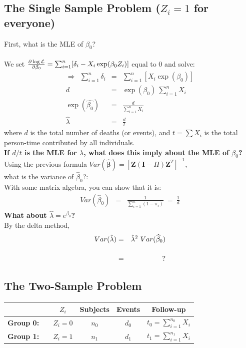 \documentclass[11pt,psfig]{book}
\newcommand{\bfZ}{\mathbf{Z}}
\newcommand{\bfbeta}{\mathbf{\beta}}
\newcommand{\bfI}{\mathbf{I}}
\begin{document}
\subsection{The Single Sample Problem ($ Z_i = 1$ for everyone)}

First, what is the MLE of $\beta_0$?\\
\\[2ex]
We set  $\frac{\partial\log{\cal L}}{\partial
\beta_0}=\sum_{i=1}^{n}  [{\delta_i} - X_i \exp( \beta_0 Z_i )]$
equal to 0 and solve:
\begin{eqnarray*}
\Rightarrow ~~ \sum_{i=1}^{n} {\delta_i} & = &
\sum_{i=1}^{n} [X_i \exp(\beta_0)]\\
d & = & \exp(\beta_0) ~\sum_{i=1}^n X_i\\
\exp(\widehat{\beta_0}) & = & \frac{d}{\sum_{i=1}^n X_i}\\
\hat{\lambda} & = & \frac{d}{t}
\end{eqnarray*}
where $d$ is the total number of deaths (or events), and
$t=\sum X_i$ is the total person-time contributed by all individuals.
\\[2ex]
{\bf If $d/t$ is the MLE for $\lambda$, what does this imply about
the MLE of $\beta_0$?}
\\[2ex]
Using the previous formula
$Var(\hat{\bfbeta}) = \left[ \bfZ (\bfI-\Pi) \bfZ^T \right]^{-1}$, \\
what is the variance of $\widehat{\beta}_0$?:
\\[2ex]
With some matrix algebra, you can show that it is:
\begin{eqnarray*}
Var(\widehat{\beta}_0) & = & \frac{1}{\sum_{i=1}^n (1-\pi_i)} ~=~ \frac{1}{d}
\end{eqnarray*}
{\bf What about $\hat{\lambda} = e^{\hat{\beta}_0}$?}
\\[2ex]
By the delta method,
\begin{eqnarray*}
Var(\hat{\lambda}) & = & \hat\lambda^2 ~ Var(\widehat{\beta}_0)\\[3ex]
& = & ~~{\bf ?}
\end{eqnarray*}
\subsection{The Two-Sample Problem}
\begin{center}
\begin{tabular}{lcccc}
\hline
& $Z_i$ & Subjects & Events & Follow-up \\ \hline
{\bf Group 0:}~~
& $Z_{i}= 0$ & $n_0$ & $d_0$ & $t_0=\sum_{i=1}^{n_0} X_i$\\[1ex]
{\bf Group 1:}
& $Z_{i}= 1$ & $n_1$ & $d_1$ & $t_1=\sum_{i=1}^{n_1} X_i$ \\ \hline
\end{tabular}
\end{center}
\end{document}
